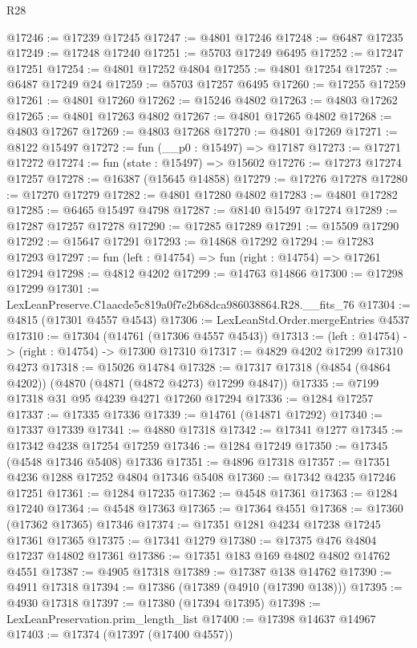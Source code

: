 \begin{lexlean}{R28}
\begin{coremodule}
@17246 := @17239 @17245
@17247 := @4801 @17246
@17248 := @6487 @17235
@17249 := @17248 @17240
@17251 := @5703 @17249 @6495
@17252 := @17247 @17251
@17254 := @4801 @17252 @4804
@17255 := @4801 @17254
@17257 := @6487 @17249 @24
@17259 := @5703 @17257 @6495
@17260 := @17255 @17259
@17261 := @4801 @17260
@17262 := @15246 @4802
@17263 := @4803 @17262
@17265 := @4801 @17263 @4802
@17267 := @4801 @17265 @4802
@17268 := @4803 @17267
@17269 := @4803 @17268
@17270 := @4801 @17269
@17271 := @8122 @15497
@17272 := fun (__p0 : @15497) => @17187
@17273 := @17271 @17272
@17274 := fun (state : @15497) => @15602
@17276 := @17273 @17274 @17257
@17278 := @16387 (@15645 @14858)
@17279 := @17276 @17278
@17280 := @17270 @17279
@17282 := @4801 @17280 @4802
@17283 := @4801 @17282
@17285 := @6465 @15497 @4798
@17287 := @8140 @15497 @17274
@17289 := @17287 @17257 @17278
@17290 := @17285 @17289
@17291 := @15509 @17290
@17292 := @15647 @17291
@17293 := @14868 @17292
@17294 := @17283 @17293
@17297 := fun (left : @14754) => fun (right : @14754) => @17261 @17294
@17298 := @4812 @4202
@17299 := @14763 @14866
@17300 := @17298 @17299
@17301 := LexLeanPreserve.C1aacde5c819a0f7e2b68dca986038864.R28.__fits_76
@17304 := @4815 (@17301 @4557 @4543)
@17306 := LexLeanStd.Order.mergeEntries @4537
@17310 := @17304 (@14761 (@17306 @4557 @4543))
@17313 := (left : @14754) -> (right : @14754) -> @17300 @17310
@17317 := @4829 @4202 @17299 @17310 @4273
@17318 := @15026 @14784
@17328 := @17317 @17318 (@4854 (@4864 @4202)) (@4870 (@4871 (@4872 @4273) @17299 @4847))
@17335 := @7199 @17318 @31 @95 @4239 @4271 @17260 @17294
@17336 := @1284 @17257
@17337 := @17335 @17336
@17339 := @14761 (@14871 @17292)
@17340 := @17337 @17339
@17341 := @4880 @17318
@17342 := @17341 @1277
@17345 := @17342 @4238 @17254 @17259
@17346 := @1284 @17249
@17350 := @17345 (@4548 @17346 @5408) @17336
@17351 := @4896 @17318
@17357 := @17351 @4236 @1288 @17252 @4804 @17346 @5408
@17360 := @17342 @4235 @17246 @17251
@17361 := @1284 @17235
@17362 := @4548 @17361
@17363 := @1284 @17240
@17364 := @4548 @17363
@17365 := @17364 @4551
@17368 := @17360 (@17362 @17365) @17346
@17374 := @17351 @1281 @4234 @17238 @17245 @17361 @17365
@17375 := @17341 @1279
@17380 := @17375 @476 @4804 @17237 @14802 @17361
@17386 := @17351 @183 @169 @4802 @4802 @14762 @4551
@17387 := @4905 @17318
@17389 := @17387 @138 @14762
@17390 := @4911 @17318
@17394 := @17386 (@17389 (@4910 (@17390 @138)))
@17395 := @4930 @17318
@17397 := @17380 (@17394 @17395)
@17398 := LexLeanPreservation.prim_length_list
@17400 := @17398 @14637 @14967
@17403 := @17374 (@17397 (@17400 @4557))

\end{coremodule}
\end{lexlean}
